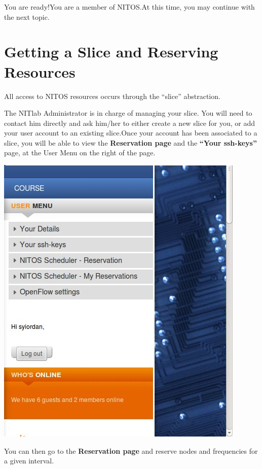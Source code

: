 \documentclass[letterpaper,10pt,english]{sphinxmanual}
\begin{document}
You are ready!You are a member of NITOS.At this time, you may continue with the next topic.


\section{Getting a Slice and Reserving Resources}
\label{get_reserve:label-name}\label{get_reserve::doc}\label{get_reserve:getting-a-slice-and-reserving-resources}
All access to NITOS resources occurs through the “slice” abstraction.

The NITlab Administrator is in charge of managing your slice. You will need to contact him directly and ask him/her to either create a new slice for you, or add your user account to an existing slice.Once your account has been associated to a slice, you will be able to view the \textbf{Reservation page} and the \textbf{``Your ssh-keys''} page, at the User Menu on the right of the page.

\includegraphics{user_menu.jpg}

You can then go to the \textbf{Reservation page} and reserve nodes and frequencies for a given interval.
\end{document}
